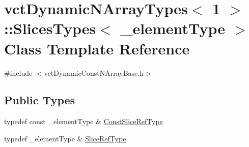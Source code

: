 \hypertarget{classvct_dynamic_n_array_types_3_011_01_4_1_1_slices_types}{\section{vct\-Dynamic\-N\-Array\-Types$<$ 1 $>$\-:\-:Slices\-Types$<$ \-\_\-element\-Type $>$ Class Template Reference}
\label{classvct_dynamic_n_array_types_3_011_01_4_1_1_slices_types}
}


{\ttfamily \#include $<$vct\-Dynamic\-Const\-N\-Array\-Base.\-h$>$}

\subsection*{Public Types}
\begin{DoxyCompactItemize}
\item 
typedef const \-\_\-element\-Type \& \hyperlink{classvct_dynamic_n_array_types_3_011_01_4_1_1_slices_types_a18f8addeaaa816d30b9ed8a7e7dd8f77}{Const\-Slice\-Ref\-Type}
\item 
typedef \-\_\-element\-Type \& \hyperlink{classvct_dynamic_n_array_types_3_011_01_4_1_1_slices_types_a34c9917853ea79e85ef0924a9a56a60f}{Slice\-Ref\-Type}
\end{DoxyCompactItemize}
